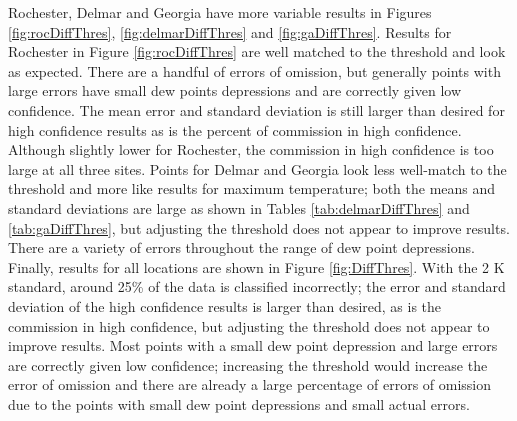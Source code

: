 \documentclass{book}
\begin{document}
Rochester, Delmar and Georgia have more variable results in Figures \ref{fig:rocDiffThres}, \ref{fig:delmarDiffThres} and \ref{fig:gaDiffThres}.  Results for Rochester in Figure \ref{fig:rocDiffThres} are well matched to the threshold and look as expected.  There are a handful of errors of omission, but generally points with large errors have small dew points depressions and are correctly given low confidence.  The mean error and standard deviation is still larger than desired for high confidence results as is the percent of commission in high confidence.  Although slightly lower for Rochester, the commission in high confidence is too large at all three sites.  Points for Delmar and Georgia look less well-match to the threshold and more like results for maximum temperature; both the means and standard deviations are large as shown in Tables \ref{tab:delmarDiffThres} and \ref{tab:gaDiffThres}, but adjusting the threshold does not appear to improve results.  There are a variety of errors throughout the range of dew point depressions.  Finally, results for all locations are shown in Figure \ref{fig:DiffThres}.  With the 2 K standard, around 25\% of the data is classified incorrectly; the error and standard deviation of the high confidence results is larger than desired, as is the commission in high confidence, but adjusting the threshold does not appear to improve results.  Most points with a small dew point depression and large errors are correctly given low confidence; increasing the threshold would increase the error of omission and there are already a large percentage of errors of omission due to the points with small dew point depressions and small actual errors.
\end{document}
